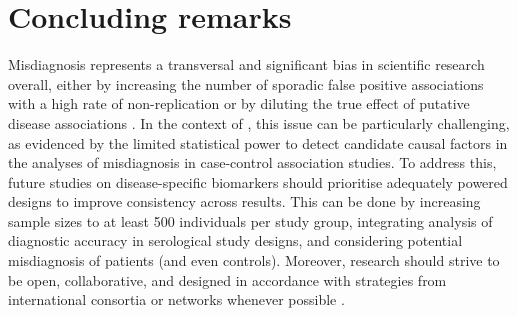 \section{Concluding remarks}



Misdiagnosis represents a transversal and significant bias in scientific research overall, either by increasing the number of sporadic false positive associations with a high rate of non-replication \citep{ioannidis2005WhyMost} or by diluting the true effect of putative disease associations \citep{westermeier2023EditorialReproducibility}.
In the context of \cfs, this issue can be particularly challenging, as evidenced by the limited statistical power to detect candidate causal factors in the analyses of misdiagnosis in case-control association studies.
To address this, future studies on disease-specific biomarkers should prioritise adequately powered designs to improve consistency across results.
This can be done by increasing sample sizes to at least 500 individuals per study group, integrating analysis of diagnostic accuracy in serological study designs, and considering potential misdiagnosis of patients (and even controls).
Moreover, research should strive to be open, collaborative, and designed in accordance with strategies from international consortia or networks whenever possible \citep{scheibenbogen2017EuropeanME, nacul2021EuropeanNetwork}.

